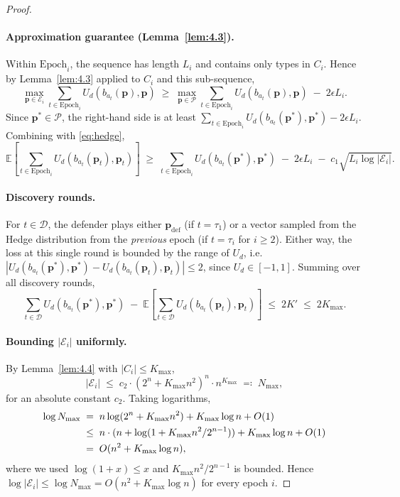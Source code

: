 \documentclass[11pt]{article}
\newcommand{\pvec}{\mathbf{p}}
\newcommand{\cE}{\mathcal{E}}
\newcommand{\cP}{\mathcal{P}}
\newcommand{\cD}{\mathcal{D}}
\newcommand{\EE}{\mathbb{E}}
\newcommand{\Kmax}{K_{\max}}
\begin{document}
\begin{proof}
\paragraph{Approximation guarantee (Lemma~\ref{lem:4.3}).} Within $\mathrm{Epoch}_i$, the sequence has length $L_i$ and contains only types in $C_i$. Hence by Lemma~\ref{lem:4.3} applied to $C_i$ and this sub-sequence,
\[
\max_{\pvec \in \cE_i} \sum_{t \in \mathrm{Epoch}_i} U_d(b_{a_t}(\pvec), \pvec) \;\ge\; \max_{\pvec \in \cP} \sum_{t \in \mathrm{Epoch}_i} U_d(b_{a_t}(\pvec), \pvec) \;-\; 2\epsilon L_i.
\]
Since $\pvec^{*}\in\cP$, the right-hand side is at least $\sum_{t \in \mathrm{Epoch}_i} U_d(b_{a_t}(\pvec^{*}), \pvec^{*}) - 2\epsilon L_i$. Combining with \eqref{eq:hedge},
\begin{equation}\label{eq:epoch-bound}
\EE\!\left[\sum_{t \in \mathrm{Epoch}_i} U_d(b_{a_t}(\pvec_t), \pvec_t)\right]
\;\ge\;
\sum_{t \in \mathrm{Epoch}_i} U_d(b_{a_t}(\pvec^{*}), \pvec^{*}) \;-\; 2\epsilon L_i \;-\; c_1 \sqrt{L_i \log|\cE_i|}.
\end{equation}

\paragraph{Discovery rounds.} For $t \in \cD$, the defender plays either $\pvec_{\mathrm{def}}$ (if $t=\tau_1$) or a vector sampled from the Hedge distribution from the \emph{previous} epoch (if $t=\tau_i$ for $i\ge 2$). Either way, the loss at this single round is bounded by the range of $U_d$, i.e.\ $|U_d(b_{a_t}(\pvec^{*}),\pvec^{*}) - U_d(b_{a_t}(\pvec_t),\pvec_t)| \le 2$, since $U_d \in [-1,1]$. Summing over all discovery rounds,
\begin{equation}\label{eq:discovery}
\sum_{t \in \cD} U_d(b_{a_t}(\pvec^{*}), \pvec^{*}) \;-\; \EE\!\left[\sum_{t \in \cD} U_d(b_{a_t}(\pvec_t), \pvec_t)\right] \;\le\; 2K' \;\le\; 2\Kmax.
\end{equation}

\paragraph{Bounding $|\cE_i|$ uniformly.} By Lemma~\ref{lem:4.4} with $|C_i|\le \Kmax$,
\[
|\cE_i| \;\le\; c_2 \cdot (2^n + \Kmax n^2)^n \cdot n^{\Kmax} \;\eqqcolon\; N_{\max},
\]
for an absolute constant $c_2$. Taking logarithms,
\begin{align}
\log N_{\max} &\;=\; n\log(2^n + \Kmax n^2) + \Kmax \log n + O(1) \notag\\
&\;\le\; n\cdot(n + \log(1 + \Kmax n^2 / 2^{n-1})) + \Kmax \log n + O(1) \notag\\
&\;=\; O(n^2 + \Kmax \log n),\label{eq:logN}
\end{align}
where we used $\log(1+x)\le x$ and $\Kmax n^2 / 2^{n-1}$ is bounded. Hence $\log |\cE_i| \le \log N_{\max} = O(n^2 + \Kmax \log n)$ for every epoch $i$.


\end{proof}
\end{document}

